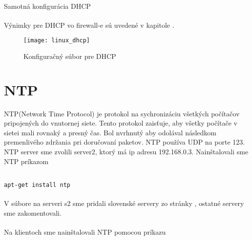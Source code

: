 \paragraph{}
Samotná konfigurácia DHCP

\paragraph{}
Výnimky pre DHCP vo firewall-e sú uvedené v kapitole .


\begin{figure}[!htb]
\centering
\texttt{[image: linux\_dhcp]}
\caption{Konfiguračný súbor pre DHCP}
\label{fig:dhcp_config}
\end{figure}

\section{NTP}
\paragraph{}
NTP(Network Time Protocol) je protokol na sychronizáciu všetkých počítačov pripojených do vnutornej siete. Tento protokol zaisťuje, aby všetky počítače v sietei mali rovnaký a presný čas. Bol nvrhnutý aby odolával následkom premenlivého zdržania pri doručovaní paketov. NTP používa UDP na porte 123. NTP server sme zvolili server2, ktorý má ip adresu 192.168.0.3. Nainštalovali sme NTP príkazom

\noindent
{\selectfont
\begin{small}
\begin{verbatim}

apt-get install ntp

\end{verbatim}
\end{small}
}

\paragraph{}
V súbore na serveri s2  sme pridali slovenské servery zo stránky , ostatné servery sme zakomentovali. 

\paragraph{}
Na klientoch sme nainštalovali NTP pomocou príkazu


